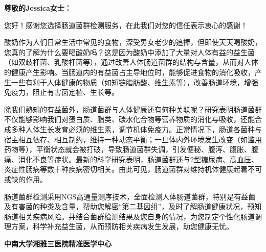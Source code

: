 



\setlength{\arrayrulewidth}{1pt}
\fontsize{9.3pt}{17pt}\selectfont
\color{gray2}

\vspace*{10mm}
{\noindent\bf\sanhao 尊敬的Jessica女士：}

\vspace*{6mm}

您好！感谢您选择肠道菌群检测服务，在此我们对您的信任表示衷心的感谢！

酸奶作为人们日常生活中常见的食物，深受男女老少的追捧，但即使天天喝酸奶，您真的了解为什么要喝酸奶吗？这是因为酸奶中添加了大量对人体有益的益生菌（如双歧杆菌、乳酸杆菌等），通过改善人体肠道菌群的结构与含量，从而对人体的健康产生影响。当肠道内的有益菌占主导地位时，能够促进食物的消化吸收，产生一些有利于人体健康的物质（如短链脂肪酸、维生素等），改善肠道环境，增强免疫力，阻止有害菌定植、生长等。

除我们熟知的有益菌外，肠道菌群与人体健康还有何种关联呢？研究表明肠道菌群不仅能够影响我们对蛋白质、脂类、碳水化合物等营养物质的消化与吸收，还能合成多种人体生长发育必须的维生素，调节机体免疫力。正常情况下，肠道各菌种与宿主相互依存、相互制约，维持一种动态平衡；一旦体内外环境发生改变（如滥用药物等），平衡状态就会被打破，导致肠道菌群失调，引发便秘、腹泻、腹胀、腹痛、消化不良等症状。最新的科学研究表明，肠道菌群还与2型糖尿病、高血压、炎症性肠病等数十种疾病密切相关。由此可见，肠道菌群对维持机体健康起着不可或缺的作用。

肠道菌群检测采用NGS高通量测序技术，全面检测人体肠道菌群，特别是有益菌及有害菌的种类及含量，帮助您解密“第二基因组”，及时了解肠道健康状况，预知肠道相关疾病风险。并结合菌群检测结果及您自身的情况，为您制定个性化肠道调理方案，科学补充益生菌，从而预防相关疾病发生发展，助您健康无忧。

\vspace*{8mm}
\noindent\null\hfill
{\bf\sanhao 中南大学湘雅三医院精准医学中心}


